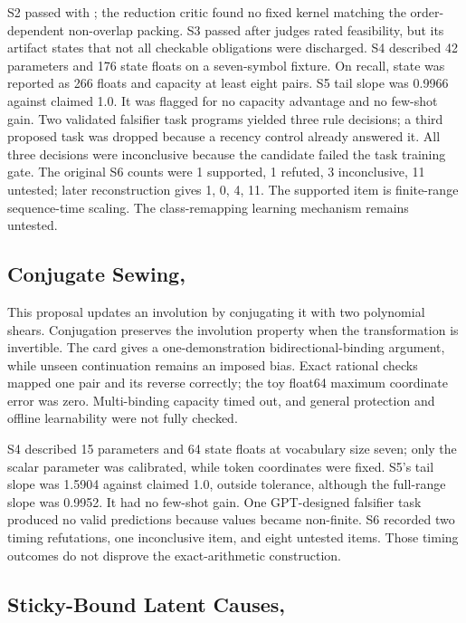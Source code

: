 S2 passed with ; the reduction critic found no fixed kernel matching the order-dependent non-overlap packing. S3 passed after judges rated feasibility, but its artifact states that not all checkable obligations were discharged. S4 described 42 parameters and 176 state floats on a seven-symbol fixture. On recall, state was reported as 266 floats and capacity at least eight pairs. S5 tail slope was 0.9966 against claimed 1.0. It was flagged for no capacity advantage and no few-shot gain. Two validated falsifier task programs yielded three rule decisions; a third proposed task was dropped because a recency control already answered it. All three decisions were inconclusive because the candidate failed the task training gate. The original S6 counts were 1 supported, 1 refuted, 3 inconclusive, 11 untested; later reconstruction gives 1, 0, 4, 11. The supported item is finite-range sequence-time scaling. The class-remapping learning mechanism remains untested.

\subsection{Conjugate Sewing, }

This proposal updates an involution by conjugating it with two polynomial shears. Conjugation preserves the involution property when the transformation is invertible. The card gives a one-demonstration bidirectional-binding argument, while unseen continuation remains an imposed bias. Exact rational checks mapped one pair and its reverse correctly; the toy float64 maximum coordinate error was zero. Multi-binding capacity timed out, and general protection and offline learnability were not fully checked.

S4 described 15 parameters and 64 state floats at vocabulary size seven; only the scalar parameter was calibrated, while token coordinates were fixed. S5's tail slope was 1.5904 against claimed 1.0, outside tolerance, although the full-range slope was 0.9952. It had no few-shot gain. One GPT-designed falsifier task produced no valid predictions because values became non-finite. S6 recorded two timing refutations, one inconclusive item, and eight untested items. Those timing outcomes do not disprove the exact-arithmetic construction.

\subsection{Sticky-Bound Latent Causes, }

